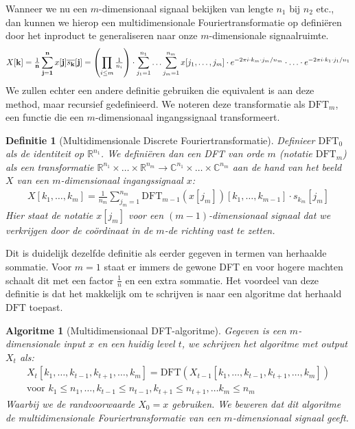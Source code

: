 \documentclass[11pt]{report}
\newcommand{\R}{\mathbb{R}}
\newcommand{\C}{\mathbb{C}}
\theoremstyle{plain}
\newtheorem*{algo}{Algoritme}
\newtheorem*{definitie}{Definitie}
\theoremstyle{remark}
\newcommand{\eq}[1]{\begin{eqnarray*} #1 \end{eqnarray*}}
\newcommand{\DFT}{\text{DFT}}
\newcommand{\dpii}{{2\pi i}}
\begin{document}
Wanneer we nu een $m$-dimensionaal signaal bekijken van lengte $n_1$ bij $n_2$ etc., dan kunnen we
hierop een multidimensionale Fouriertransformatie op defini\"eren door het inproduct te generaliseren naar 
onze $m$-dimensionale signaalruimte.
\eq{
  X[\bold k] = \tfrac{1}{\bold n}\sum_{\bold j = \bold 1}^{\bold n} x[\bold j] \overline{s_{\bold k}}[{\bold j}] =
  \left(\prod_{i\leq m} \tfrac{1}{n_i}\right) \cdot \sum_{j_1=1}^{n_1} \ldots \sum_{j_m=1}^{n_m} x[j_1,\ldots,j_m] \cdot 
  e^{-\dpii\cdot k_m \cdot j_m /n_m } \cdot \ldots \cdot e^{-\dpii\cdot k_1 \cdot j_1 /n_1 } 
}
We zullen echter een andere definitie gebruiken die equivalent is aan deze method, maar recursief gedefinieerd.
We noteren deze transformatie als $\DFT_m$, een functie die een $m$-dimensionaal ingangssignaal transformeert.
\begin{definitie}[Multidimensionale Discrete Fouriertransformatie]
Definieer $\DFT_0$ als de identiteit op $\R^{n_1}$.
We defini\"eren dan een DFT van orde $m$ (notatie $\DFT_m$) als een transformatie 
$\R^{n_1}\times\ldots\times\R^{n_m} \to \C^{n_1}\times\ldots\times\C^{n_m}$ aan de hand van het beeld $X$ van een $m$-dimensionaal ingangssignaal $x$:
\eq{
  X[k_1,\ldots,k_m] = \tfrac{1}{n_m}\sum_{j_m=1}^{n_m} \DFT_{m-1}(x[j_m])[k_1,\ldots,k_{m-1}] \cdot s_{k_m}[j_m]  
}
Hier staat de notatie $x[j_m]$ voor een $(m-1)$-dimensionaal signaal dat we verkrijgen door de co\"ordinaat
in de $m$-de richting vast te zetten.
\end{definitie}
Dit is duidelijk dezelfde definitie als eerder gegeven in termen van herhaalde sommatie. Voor $m=1$ staat er immers de gewone DFT en voor hogere machten schaalt dit met een factor $\tfrac{1}{n}$ en een extra sommatie.
Het voordeel van deze definitie is dat het makkelijk om te schrijven is naar een algoritme dat 
herhaald $\DFT$ toepast.
\begin{algo}[Multidimensionaal DFT-algoritme]
Gegeven is een $m$-dimensionale input $x$ en een huidig level $t$, 
we schrijven het algoritme met output $X_t$ als:
\eq{
  X_{t}[k_1,\ldots,k_{t-1},k_{t+1},\ldots,k_m] = \DFT(X_{t-1}[k_1,\ldots,k_{t-1},k_{t+1},\ldots,k_m]) \\
  \text{voor } k_1\leq n_1, \ldots ,k_{t-1}\leq n_{t-1}, k_{t+1}\leq n_{t+1}, \ldots k_m \leq n_m
}
Waarbij we de randvoorwaarde $X_0 = x$ gebruiken. We beweren dat dit algoritme de multidimensionale Fouriertransformatie van een $m$-dimensionaal signaal geeft.
\end{algo}
\end{document}
